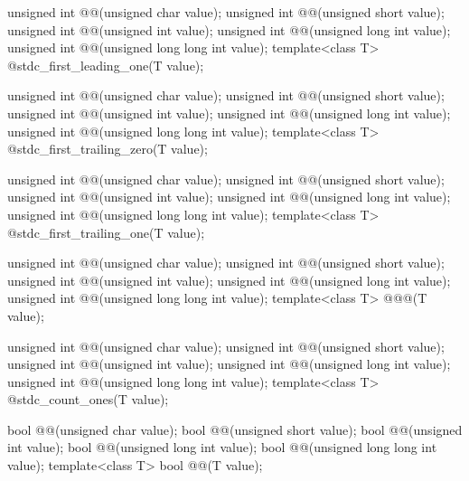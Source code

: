 \begin{codeblock}
unsigned int @@(unsigned char value);
unsigned int @@(unsigned short value);
unsigned int @@(unsigned int value);
unsigned int @@(unsigned long int value);
unsigned int @@(unsigned long long int value);
template<class T> @\seebelow@ stdc_first_leading_one(T value);

unsigned int @@(unsigned char value);
unsigned int @@(unsigned short value);
unsigned int @@(unsigned int value);
unsigned int @@(unsigned long int value);
unsigned int @@(unsigned long long int value);
template<class T> @\seebelow@ stdc_first_trailing_zero(T value);

unsigned int @@(unsigned char value);
unsigned int @@(unsigned short value);
unsigned int @@(unsigned int value);
unsigned int @@(unsigned long int value);
unsigned int @@(unsigned long long int value);
template<class T> @\seebelow@ stdc_first_trailing_one(T value);

unsigned int @@(unsigned char value);
unsigned int @@(unsigned short value);
unsigned int @@(unsigned int value);
unsigned int @@(unsigned long int value);
unsigned int @@(unsigned long long int value);
template<class T> @\seebelow@ @@(T value);

unsigned int @@(unsigned char value);
unsigned int @@(unsigned short value);
unsigned int @@(unsigned int value);
unsigned int @@(unsigned long int value);
unsigned int @@(unsigned long long int value);
template<class T> @\seebelow@ stdc_count_ones(T value);

bool @@(unsigned char value);
bool @@(unsigned short value);
bool @@(unsigned int value);
bool @@(unsigned long int value);
bool @@(unsigned long long int value);
template<class T> bool @@(T value);


\end{codeblock}
